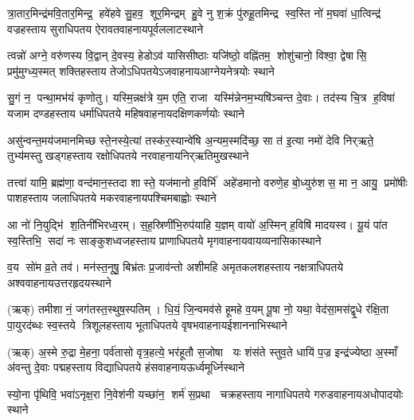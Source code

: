 %
{त्रा॒तार॒मिन्द्र॑मवि॒तार॒मिन्द्र॒ हवे॑हवे सु॒हव॒ शूर॒मिन्द्रम्}%
{हु॒वे नु श॒क्रं पु॑रुहू॒तमिन्द्र स्व॒स्ति नो॑ म॒घवा॑ धा॒त्विन्द्र॑}%
{वज्रहस्ताय सुराधिपतय ऐरावतवाहनाय}{पूर्व}{ललाटस्थाने}

%
{त्वन्नो॑ अग्ने॒ वरु॑णस्य वि॒द्वान् दे॒वस्य॒ हेडोऽव॑ यासिसीष्ठाः}%
{यजि॑ष्ठो॒ वह्नि॑तम॒ शोशु॑चानो॒ विश्वा॒ द्वेषासि॒ प्रमु॑मुग्ध्य॒स्मत्}%
{शक्तिहस्ताय तेजोऽधिपतयेऽजवाहनाय}{आग्नेय}{नेत्रयोः स्थाने}

%
{सु॒गं न॒ पन्था॒मभ॑यं कृणोतु। यस्मि॒न्नक्ष॑त्रे य॒म एति॒ राजा}%
{यस्मि॑न्नेनम॒भ्यषि॑ञ्चन्त दे॒वाः। तद॑स्य चि॒त्र ह॒विषा॑ यजाम}%
{दण्डहस्ताय धर्माधिपतये महिषवाहनाय}{दक्षिण}{कर्णयोः स्थाने}

%
{असु॑न्वन्त॒मय॑जमानमिच्छ स्ते॒नस्ये॒त्यां तस्क॑र॒स्यान्वे॑षि}%
{अ॒न्यम॒स्मदि॑च्छ॒ सा त॑ इ॒त्या नमो॑ देवि निर्‌ऋते॒ तुभ्य॑मस्तु}%
{खड्गहस्ताय रक्षोधिपतये नरवाहनाय}{निर्‌ऋति}{मुखस्थाने}

%
{तत्त्वा॑ यामि॒ ब्रह्म॑णा॒ वन्द॑मान॒स्तदा शास्ते॒ यज॑मानो ह॒विर्भि॑}%
{अहे॑डमानो वरुणे॒ह बो॒ध्युरु॑शस॒ मा न॒ आयु॒ प्रमो॑षीः}%
{पाशहस्ताय जलाधिपतये मकरवाहनाय}{पश्चिम}{बाह्वोः स्थाने}

%
{आ नो॑ नि॒युद्भि॑ श॒तिनी॑भिरध्व॒रम्। स॒ह॒स्रिणी॑भि॒रुप॑याहि य॒ज्ञम्}%
{वायो॑ अ॒स्मिन् ह॒विषि॑ मादयस्व। यू॒यं पा॑त स्व॒स्तिभि॒ सदा॑ नः}%
{साङ्कुशध्वजहस्ताय प्राणाधिपतये मृगवाहनाय}{वायव्य}{नासिकास्थाने}

%
{व॒य सो॑म व्र॒ते तव॑। मन॑स्त॒नूषु॒ बिभ्र॑तः}%
{प्र॒जाव॑न्तो अशीमहि}%
{अमृतकलशहस्ताय नक्षत्राधिपतये अश्ववाहनाय}{उत्तर}{हृदयस्थाने}

%
{(ऋक्) तमीशानं॒ जग॑तस्त॒स्थुष॒स्पतिम्। धि॒यं॒ जि॒न्वमव॑से हूमहे व॒यम्}%
{पू॒षा नो॒ यथा॒ वेद॑सा॒मस॑द्वृ॒धे र॑क्षि॒ता पा॒युरद॑ब्धः स्व॒स्तये}
{त्रिशूलहस्ताय भूताधिपतये वृषभवाहनाय}{ईशान}{नाभिस्थाने}

%
{(ऋक्) अ॒स्मे रु॒द्रा मे॒हना॒ पर्व॑तासो वृत्र॒हत्ये॒ भर॑हूतौ स॒जोषा }%
{यः शंस॑ते स्तुव॒ते धायि॑ प॒ज्र इन्द्र॑ज्येष्ठा अ॒स्माँ अ॑वन्तु दे॒वाः}%
{पद्महस्ताय विद्याधिपतये हंसवाहनाय}{ऊर्ध्व}{मूर्ध्निस्थाने}


%
{स्यो॒ना पृ॑थिवि॒ भवा॑ऽनृक्ष॒रा नि॒वेश॑नी}%
{यच्छा॑न॒ शर्म॑ स॒प्रथा}%
{चक्रहस्ताय नागाधिपतये गरुडवाहनाय}{अधो}{पादयोः स्थाने}

